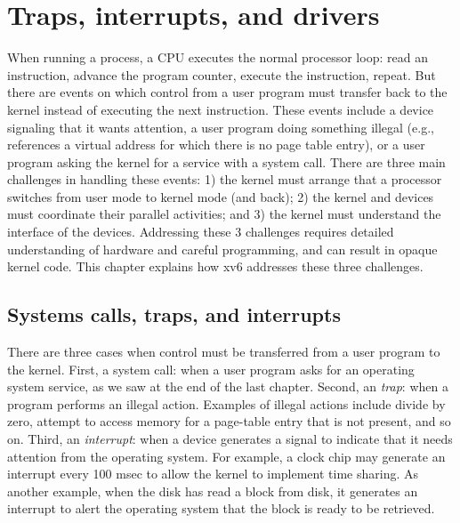 \chapter{Traps, interrupts, and drivers}
\label{CH:TRAP}

When running a process, a CPU executes the normal processor loop: read an
instruction, advance the program counter, execute the instruction, repeat.  But
there are events on which control from a user program must transfer back to the
kernel instead of executing the next instruction.  These events include a device
signaling that it wants attention, a user program doing something illegal (e.g.,
references a virtual address for which there is no page table entry), or a user
program asking the kernel for a service with a system call.  There are three
main challenges in handling these events: 1) the kernel must arrange that a
processor switches from user mode to kernel mode (and back); 2) the kernel and
devices must coordinate their parallel activities; and 3) the kernel must
understand the interface of the devices.  Addressing these 3 challenges requires
detailed understanding of hardware and careful programming, and can result in
opaque kernel code.  This chapter explains how xv6 addresses these three
challenges.

\section{Systems calls, traps, and interrupts}

There are three cases when control must be transferred from a user program to
the kernel. First, a system call: when a user program asks for an operating
system service, as we saw at the end of the last chapter.
Second, an
\textit{trap}:
when a program performs an illegal action. Examples of illegal actions include
divide by zero, attempt to access memory for a page-table entry that is not
present, and so on.  Third, an
\textit{interrupt}:
when a device generates a signal to indicate that
it needs attention from the operating system.  For example, a clock chip may
generate an interrupt every 100 msec to allow the kernel to implement
time sharing.  As another example, when the disk has read a block from
disk, it generates an interrupt to alert the operating system that the
block is ready to be retrieved.

